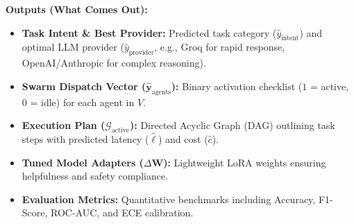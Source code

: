 \documentclass[11pt,a4paper]{article}
\begin{document}
\vspace{0.20em}
\textbf{Outputs (What Comes Out):}
\begin{itemize}[leftmargin=1.5em, itemsep=0.10em, topsep=0.04em]
    \item \textbf{Task Intent \& Best Provider:} Predicted task category ($\hat{y}_{\text{intent}}$) and optimal LLM provider ($\hat{y}_{\text{provider}}$, e.g., Groq for rapid response, OpenAI/Anthropic for complex reasoning).
    \item \textbf{Swarm Dispatch Vector ($\hat{\mathbf{y}}_{\text{agents}}$):} Binary activation checklist ($1$ = active, $0$ = idle) for each agent in $V$.
    \item \textbf{Execution Plan ($\mathcal{G}_{\text{active}}$):} Directed Acyclic Graph (DAG) outlining task steps with predicted latency ($\hat{\ell}$) and cost ($\hat{c}$).
    \item \textbf{Tuned Model Adapters ($\Delta \mathbf{W}$):} Lightweight LoRA weights ensuring helpfulness and safety compliance.
    \item \textbf{Evaluation Metrics:} Quantitative benchmarks including Accuracy, F1-Score, ROC-AUC, and ECE calibration.
\end{itemize}
\end{document}
